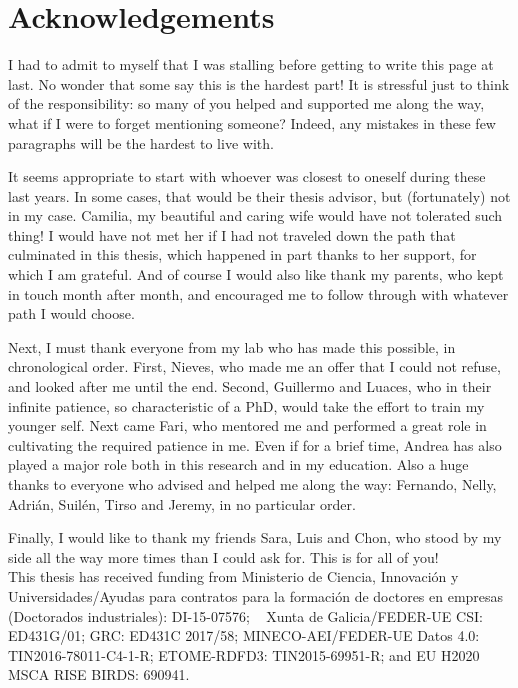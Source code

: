 \chapter*{Acknowledgements}
I had to admit to myself that I was stalling before getting to write this page at last. No wonder that some say this is the hardest part! It is stressful just to think of the responsibility: so many of you helped and supported me along the way, what if I were to forget mentioning someone? Indeed, any mistakes in these few paragraphs will be the hardest to live with.

It seems appropriate to start with whoever was closest to oneself during these last years. In some cases, that would be their thesis advisor, but (fortunately) not in my case. Camilia, my beautiful and caring wife would have not tolerated such thing! I would have not met her if I had not traveled down the path that culminated in this thesis, which happened in part thanks to her support, for which I am grateful. And of course I would also like thank my parents, who kept in touch month after month, and encouraged me to follow through with whatever path I would choose.

Next, I must thank everyone from my lab who has made this possible, in chronological order. First, Nieves, who made me an offer that I could not refuse, and looked after me until the end. Second, Guillermo and Luaces, who in their infinite patience, so characteristic of a PhD, would take the effort to train my younger self. Next came Fari, who mentored me and performed a great role in cultivating the required patience in me. Even if for a brief time, Andrea has also played a major role both in this research and in my education. Also a huge thanks to everyone who advised and helped me along the way: Fernando, Nelly, Adri\'an, Suil\'en, Tirso and Jeremy, in no particular order.

Finally, I would like to thank my friends Sara, Luis and Chon, who stood by my side all the way more times than I could ask for. This is for all of you!\\

\vspace*{\fill}
\small{This thesis has received funding from Ministerio de Ciencia, Innovaci\'on y Universidades/Ayudas para contratos para la formaci\'on de doctores en empresas (Doctorados industriales): DI-15-07576; ~  Xunta de Galicia/FEDER-UE CSI: ED431G/01; GRC: ED431C 2017/58; MINECO-AEI/FEDER-UE Datos 4.0: TIN2016-78011-C4-1-R; ETOME-RDFD3: TIN2015-69951-R; and EU H2020 MSCA RISE BIRDS: 690941.}


